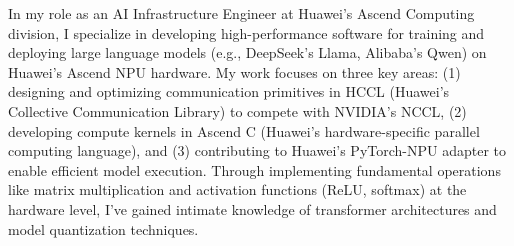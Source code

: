 \documentclass{article}
\begin{document}

In my role as an AI Infrastructure Engineer at Huawei's Ascend Computing division, I specialize in developing high-performance software for training and deploying large language models (e.g., DeepSeek's Llama, Alibaba's Qwen) on Huawei's Ascend NPU hardware. My work focuses on three key areas: (1) designing and optimizing communication primitives in HCCL (Huawei's Collective Communication Library) to compete with NVIDIA's NCCL, (2) developing compute kernels in Ascend C (Huawei's hardware-specific parallel computing language), and (3) contributing to Huawei's PyTorch-NPU adapter to enable efficient model execution. Through implementing fundamental operations like matrix multiplication and activation functions (ReLU, softmax) at the hardware level, I've gained intimate knowledge of transformer architectures and model quantization techniques.
\end{document}
